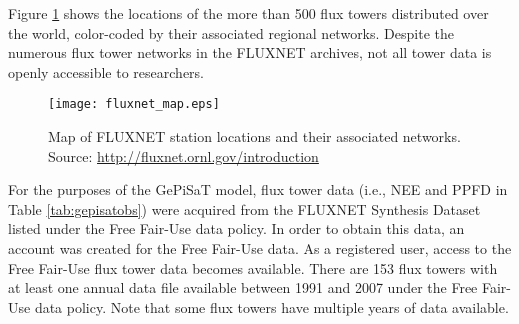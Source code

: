 Figure \ref{fig:fluxmap} shows the locations of the more than 500 flux towers distributed over the world, color-coded by their associated regional networks. 
Despite the numerous flux tower networks in the FLUXNET archives, not all tower data is openly accessible to researchers.
\begin{figure}[ht!]
    \texttt{[image: fluxnet\_map.eps]}
    \caption{Map of FLUXNET station locations and their associated networks.  Source: \url{http://fluxnet.ornl.gov/introduction}}
    \label{fig:fluxmap}
\end{figure}

For the purposes of the GePiSaT model, flux tower data (i.e., NEE and PPFD in Table \ref{tab:gepisatobs}) were acquired from the FLUXNET Synthesis Dataset\footnotemark {} listed under the Free Fair-Use data policy.  
In order to obtain this data, an account was created for the Free Fair-Use data\footnotemark {}.  
As a registered user, access to the Free Fair-Use flux tower data becomes available.  
There are 153 flux towers with at least one annual data file available between 1991 and 2007 under the Free Fair-Use data policy.  
Note that some flux towers have multiple years of data available. 
